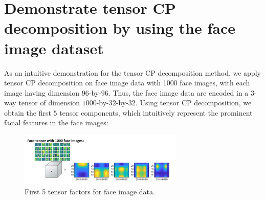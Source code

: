 \section{Demonstrate tensor CP decomposition by using the face image dataset}
As an intuitive demonstration for the tensor CP decomposition method, we apply tensor CP decomposition on face image data with 1000 face images, with each image having dimension $96$-by-$96$. Thus, the face image data are encoded in a $3$-way tensor of dimension $1000$-by-$32$-by-$32$. Using tensor CP decomposition, we obtain the first $5$ tensor components, which intuitively represent the prominent facial features in the face images: 
\begin{figure}[H]
    \centering
        \includegraphics[width=0.7\textwidth]{presentation/Slide2.jpg}
        \caption{First 5 tensor factors for face image data.}
    \end{figure}

